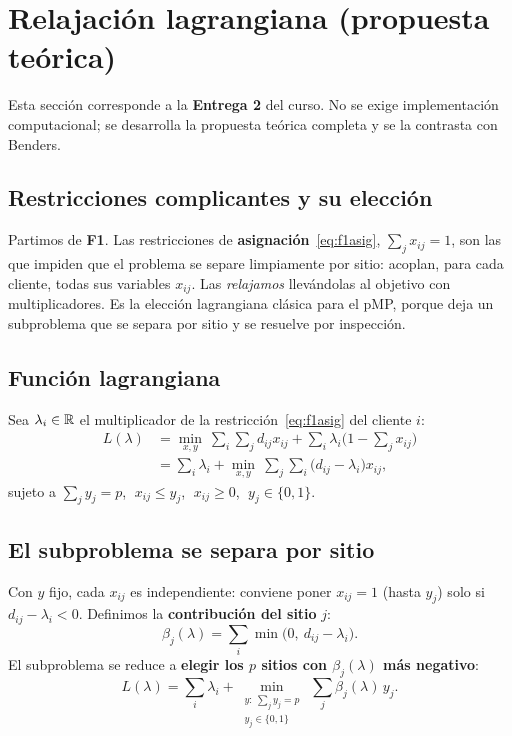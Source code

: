 \section{Relajación lagrangiana (propuesta teórica)}
\label{sec:lagrangiana}

Esta sección corresponde a la \textbf{Entrega 2} del curso. No se exige implementación
computacional; se desarrolla la propuesta teórica completa y se la contrasta con Benders.

\subsection{Restricciones complicantes y su elección}
Partimos de \textbf{F1}. Las restricciones de \textbf{asignación}~\eqref{eq:f1asig},
$\sum_j x_{ij}=1$, son las que impiden que el problema se separe limpiamente por sitio: acoplan,
para cada cliente, todas sus variables $x_{ij}$. Las \emph{relajamos} llevándolas al objetivo con
multiplicadores. Es la elección lagrangiana clásica para el pMP, porque deja un subproblema que
se separa por sitio y se resuelve por inspección.

\subsection{Función lagrangiana}
Sea $\lambda_i\in\mathbb{R}$ el multiplicador de la restricción~\eqref{eq:f1asig} del cliente $i$:
\begin{align}
  L(\lambda)
  &= \min_{x,y}\ \sum_{i}\sum_{j} d_{ij}x_{ij} + \sum_i \lambda_i\Big(1-\sum_j x_{ij}\Big) \nonumber\\
  &= \sum_i \lambda_i + \min_{x,y}\ \sum_{j}\sum_{i}\big(d_{ij}-\lambda_i\big)x_{ij},
  \label{eq:lagr}
\end{align}
sujeto a $\sum_j y_j=p$, $\;x_{ij}\le y_j$, $\;x_{ij}\ge 0$, $\;y_j\in\{0,1\}$.

\subsection{El subproblema se separa por sitio}
Con $y$ fijo, cada $x_{ij}$ es independiente: conviene poner $x_{ij}=1$ (hasta $y_j$) solo si
$d_{ij}-\lambda_i<0$. Definimos la \textbf{contribución del sitio} $j$:
\[
  \beta_j(\lambda)=\sum_{i}\min\big(0,\ d_{ij}-\lambda_i\big).
\]
El subproblema se reduce a \textbf{elegir los $p$ sitios con $\beta_j(\lambda)$ más negativo}:
\begin{equation}
  L(\lambda)=\sum_i \lambda_i + \min_{\substack{y:\ \sum_j y_j=p\\ y_j\in\{0,1\}}}\ \sum_j \beta_j(\lambda)\,y_j .
  \label{eq:lagsub}
\end{equation}

